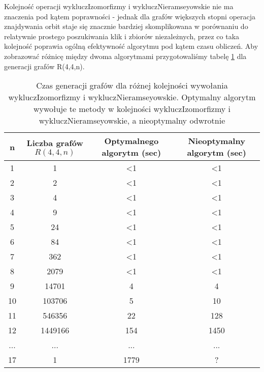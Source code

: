 Kolejność operacji wykluczIzomorfizmy i wykluczNieramseyowskie nie ma znaczenia pod kątem poprawności - jednak dla grafów większych stopni operacja znajdywania orbit staje się znacznie bardziej skomplikowana w porównaniu do relatywnie prostego poszukiwania klik i zbiorów niezależnych, przez co taka kolejność poprawia ogólną efektywność algorytmu pod kątem czasu obliczeń. Aby zobrazować różnicę między dwoma algorytmami przygotowaliśmy tabelę \ref{czasgen} dla generacji grafów R(4,4,n).

\begin{table}[H]
 \begin{center}
 \begin{tabular}{|c c c c|} 
 \hline
 n & Liczba grafów $R(4,4,n)$ & Optymalnego algorytm (sec) & Nieoptymalny algorytm (sec) \\ 
 \hline\hline
 1 & 1 & <1 & <1\\ 
 \hline
 2 & 2 & <1 & <1\\
 \hline
 3 & 4 & <1 & <1\\
 \hline
 4 & 9 & <1 & <1\\
 \hline
 5 & 24 & <1 & <1\\
 \hline
 6 & 84 & <1 & <1\\
 \hline
 7 & 362 & <1 & <1\\
 \hline
 8 & 2079 & <1 & <1\\
 \hline
 9 & 14701 & 4 & 4\\
 \hline
 10 & 103706 & 5 & 10\\
 \hline
 11 & 546356 & 22 & 128\\
 \hline
 12 & 1449166 & 154 & 1450\\
 \hline
 ... & ... & ... & ...\\
 \hline
  17 & 1 & 1779 & ?\\
 \hline
\end{tabular}
\end{center}
 \caption{Czas generacji grafów dla różnej kolejności wywołania wykluczIzomorfizmy i wykluczNieramseyowskie. Optymalny algorytm wywołuje te metody w kolejności wykluczIzomorfizmy i wykluczNieramseyowskie, a nieoptymalny odwrotnie}
 \label{czasgen}
 \end{table}


